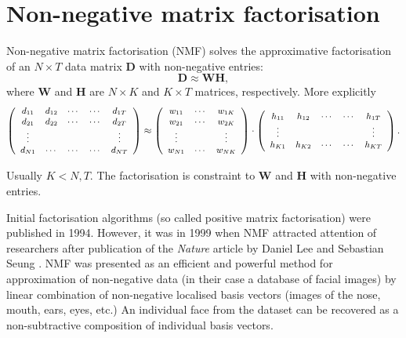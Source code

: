 \section{Non-negative matrix factorisation\label{sec:NMF}}
Non-negative matrix factorisation (NMF) solves the approximative factorisation of an $N\times T$ data matrix $\bm{D}$ with non-negative entries:
%
\begin{equation}
	\bm{D}\approx\bm{WH},
	\label{eq:NMF approx}
\end{equation}
%
where $\bm{W}$ and $\bm{H}$ are $N\times K$ and $K\times T$  matrices, respectively. More explicitly
\begin{equation}
	\small
	\left(
	\begin{array}{ccccc} 
		d_{11} & d_{12} & \cdots &\cdots & d_{1T} \\
		d_{21} & d_{22} & \cdots & \cdots & d_{2T} \\
		\vdots & & & & \vdots\\
		d_{N1}& \cdots & \cdots & \cdots & d_{NT}\\
	\end{array}
	\right)
	\approx
	\left(
	\begin{array}{ccc} 
		w_{11} &\cdots &w_{1K} \\
		w_{21} & \cdots & w_{2K} \\
		\vdots & & \vdots\\	
		w_{N1}& \cdots & w_{NK}\\
	\end{array}
	\right)
	\cdot
	\left(
	\begin{array}{ccccc} 
		h_{11} &h_{12}&\cdots &\cdots & h_{1T} \\
		\vdots & & & & \vdots\\
		h_{K1} &h_{K2}&\cdots &\cdots & h_{KT} \\
	\end{array}
	\right).
	\label{eq:NMF approx explicit}
\end{equation}

Usually $K<N,T$. The factorisation is constraint to $\bm{W}$ and $\bm{H}$ with non-negative entries. 

Initial factorisation algorithms (so called positive matrix factorisation) \cite{Paatero1994} were published in 1994. However, it was in 1999 when NMF attracted attention of researchers after publication of the \emph{Nature} article by Daniel Lee and Sebastian Seung \cite{Lee1999}. NMF was presented as an efficient and powerful method for approximation of non-negative data (in their case a database of facial images) by linear combination of non-negative localised basis vectors (images of the nose, mouth, ears, eyes, etc.) An individual face from the dataset can be recovered as a non-subtractive composition of individual basis vectors. 

